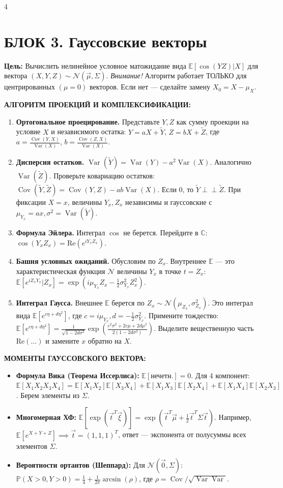 \documentclass[a4paper, landscape]{article}
\newcommand{\E}{\mathbb{E}}
\renewcommand{\P}{\mathbb{P}}
\newcommand{\N}{\mathcal{N}}
\DeclareMathOperator{\Var}{Var}
\DeclareMathOperator{\Cov}{Cov}
\begin{document}
\begin{multicols*}{4}
\section*{БЛОК 3. Гауссовские векторы}
\textbf{Цель:} Вычислить нелинейное условное матожидание вида $\E[\cos(YZ) | X]$ для вектора $(X,Y,Z) \sim \N(\vec{\mu}, \Sigma)$.
\textit{Внимание!} Алгоритм работает ТОЛЬКО для центрированных $(\mu=0)$ векторов. Если нет — сделайте замену $X_0=X-\mu_X$.

\textbf{АЛГОРИТМ ПРОЕКЦИЙ И КОМПЛЕКСИФИКАЦИИ:}
\begin{enumerate}[label=\textbf{Шаг \arabic*.}, leftmargin=*]
    \item \textbf{Ортогональное проецирование.} Представьте $Y, Z$ как сумму проекции на условие $X$ и независимого остатка:
    $Y = aX + \tilde{Y}$, $Z = bX + \tilde{Z}$, где $a = \frac{\Cov(Y,X)}{\Var(X)}$, $b = \frac{\Cov(Z,X)}{\Var(X)}$.
    \item \textbf{Дисперсия остатков.} $\Var(\tilde{Y}) = \Var(Y) - a^2\Var(X)$. Аналогично $\Var(\tilde{Z})$.
    Проверьте ковариацию остатков: $\Cov(\tilde{Y}, \tilde{Z}) = \Cov(Y,Z) - ab\Var(X)$. Если 0, то $\tilde{Y} \perp\!\!\perp \tilde{Z}$.
    При фиксации $X=x$, величины $Y_x, Z_x$ независимы и гауссовские с $\mu_{Y_x}=ax, \sigma^2=\Var(\tilde{Y})$.
    \item \textbf{Формула Эйлера.} Интеграл $\cos$ не берется. Перейдите в $\mathbb{C}$: $\cos(Y_x Z_x) = \text{Re}(e^{i Y_x Z_x})$. 
    \item \textbf{Башня условных ожиданий.} Обусловим по $Z_x$. Внутреннее $\E$ — это характеристическая функция $\N$ величины $Y_x$ в точке $t=Z_x$:
    $\E[e^{i Z_x Y_x}|Z_x] = \exp(i\mu_{Y_x} Z_x - \frac{1}{2}\sigma_{Y_x}^2 Z_x^2)$.
    \item \textbf{Интеграл Гаусса.} Внешнее $\E$ берется по $Z_x \sim \N(\mu_{Z_x}, \sigma_{Z_x}^2)$. Это интеграл вида $\E[e^{c\eta + d\eta^2}]$, где $c=i\mu_{Y_x}, d=-\frac{1}{2}\sigma_{Y_x}^2$. Примените тождество:
    $ \E[e^{c\eta + d\eta^2}] = \frac{1}{\sqrt{1-2d\sigma^2}}\exp\left( \frac{c^2\sigma^2+2c\mu+2d\mu^2}{2(1-2d\sigma^2)} \right) $.
    Выделите вещественную часть $\text{Re}(\dots)$ и замените $x$ обратно на $X$.
\end{enumerate}

\textbf{МОМЕНТЫ ГАУССОВСКОГО ВЕКТОРА:}
\begin{itemize}
    \item \textbf{Формула Вика (Теорема Иссерлиса):} $\E[\text{нечетн.}]=0$. Для 4 компонент: $\E[X_1 X_2 X_3 X_4] = \E[X_1 X_2]\E[X_3 X_4] + \E[X_1 X_3]\E[X_2 X_4] + \E[X_1 X_4]\E[X_2 X_3]$. Берем элементы из $\Sigma$.
    \item \textbf{Многомерная ХФ:} $\E[\exp(\vec{t}^T \vec{\xi})] = \exp( \vec{t}^T \vec{\mu} + \frac{1}{2} \vec{t}^T \Sigma \vec{t} )$. Например, $\E[e^{X+Y+Z}] \implies \vec{t}=(1,1,1)^T$, ответ — экспонента от полусуммы всех элементов $\Sigma$.
    \item \textbf{Вероятности ортантов (Шеппард):} Для $\N(\vec{0}, \Sigma)$: $\P(X\!>\!0, Y\!>\!0) = \frac{1}{4} + \frac{1}{2\pi}\arcsin(\rho)$, где $\rho = \Cov/\sqrt{\Var\Var}$.
\end{itemize}


\end{multicols*}
\end{document}
